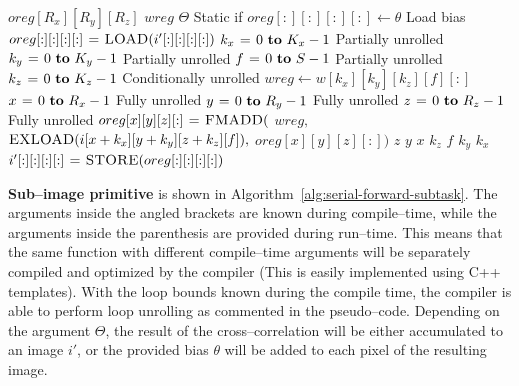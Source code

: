   \begin{algorithm}
    {\footnotesize
      \begin{codebox}
        \li {} $oreg[R_x][R_y][R_z]$
        \li {} $wreg$
        \li \If $\Theta$ \Comment Static if
        \li \Then $oreg[:][:][:][:] \gets \theta$ \Comment Load bias
        \li \Else
        \li       $oreg[:][:][:][:] \mathrel{\hspace{1pt}=\hspace{1pt}} \textnormal{\scshape LOAD}(i'[:][:][:][:])$
        \End \li {}
        \li {} $k_x \gets 0 \To K_x-1$ \Comment Partially unrolled
        \li   \Do {} $k_y \gets 0 \To K_y-1$  \Comment Partially unrolled
        \li     \Do {} $f \gets 0 \To S - 1$ \Comment Partially unrolled
        \li       \Do {} $k_z \gets 0 \To K_z-1$  \Comment Conditionally unrolled
        \li         \Do $wreg \gets w[k_x][k_y][k_z][f][:]$
        \li {} $x \gets 0 \To R_x-1$ \Comment Fully unrolled
        \li   \Do {} $y \gets 0 \To R_y-1$ \Comment Fully unrolled
        \li      \Do {} $z \gets 0 \To R_z-1$ \Comment Fully unrolled
        \li         \Do $oreg[x][y][z][:] \mathrel{\hspace{1pt}=\hspace{1pt}} \textnormal{\scshape FMADD}($
        \li       $wreg,$
        \li       $\textnormal{\scshape EXLOAD}(i[x+k_x][y+k_y][z+k_z][f]),$
        \li       $oreg[x][y][z][:])$
        \End \li {} $z$
        \End \li {} $y$
        \End \li {} $x$
        \End \li {} $k_z$
        \End \li {} $f$
        \End \li {} $k_y$
        \End \li {} $k_x$
        \li $i'[:][:][:][:] \mathrel{\hspace{1pt}=\hspace{1pt}} \textnormal{\scshape STORE}(oreg[:][:][:][:])$
      \end{codebox}
    \caption{The finest granularity primitive that computes a
      sub--image of size $R_x \times R_y \times R_z$ of $S$ images by
      performing $S^2$ cross--correlations on $S$ input images with
      kernels of size $K_x \times K_y \times K_z$.}
    \label{alg:serial-forward-subtask}
    }
  \end{algorithm}

  {\bf Sub--image primitive} is shown in
  Algorithm~\ref{alg:serial-forward-subtask}.  The arguments inside
  the angled brackets are known during compile--time, while the
  arguments inside the parenthesis are provided during run--time.
  This means that the same function with different compile--time
  arguments will be separately compiled and optimized by the compiler
  (This is easily implemented using C++ templates).  With the loop
  bounds known during the compile time, the compiler is able to
  perform loop unrolling as commented in the pseudo--code.  Depending
  on the argument $\Theta$, the result of the cross--correlation will be
  either accumulated to an image $i'$, or the provided bias $\theta$
  will be added to each pixel of the resulting image.

